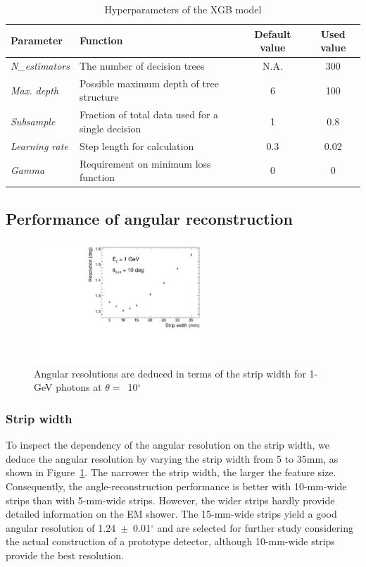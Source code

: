 \documentclass[12pt,times,draftclsnofoot,a4paper]{elsarticle}
\begin{document}
\begin{table}[hbt!]{\small
\centering
\caption{Hyperparameters of the XGB model}
\begin{tabular}{llcc}
\hline 
Parameter & Function & Default value & Used value \\ \hline 
\textit{N\_estimators} & The number of decision trees & N.A. & 300 \\  
\textit{Max. depth} & Possible maximum depth of tree structure & 6 & 100 \\ 
\textit{Subsample} & Fraction of total data used for a single decision & 1 & 0.8 \\ 
\textit{Learning rate} & Step length for calculation & 0.3 & 0.02 \\ 
\textit{Gamma} & Requirement on minimum loss function & 0 & 0 \\ 
\hline
\end{tabular}
\label{tab:XgbPar}
}\end{table}

\subsection{Performance of angular reconstruction}
\label{sec:perf}

\begin{figure}[!hbt]
\centering
\includegraphics[width=0.58\textwidth]{Fig5_width_including7.5_12.5mm.pdf}
\caption{ Angular resolutions are deduced in terms of the strip width for 1-GeV photons at $\theta=$~10$^{\circ}$ }
\label{fig:angle_reco_width}
\end{figure}
\subsubsection{Strip width}
To inspect the dependency of the angular resolution on the strip width, we deduce the angular resolution by varying the strip width from 5 to 35mm, as shown in Figure~\ref{fig:angle_reco_width}. The narrower the strip width, the larger the feature size. Consequently, the angle-reconstruction performance is better with 10-mm-wide strips than with 5-mm-wide strips. However, the wider strips hardly provide detailed information on the EM shower. The 15-mm-wide strips yield a good angular resolution of 1.24~$\pm$~0.01$^{\circ}$ and are selected for further study considering the actual construction of a prototype detector, although 10-mm-wide strips provide the best resolution.
\end{document}
